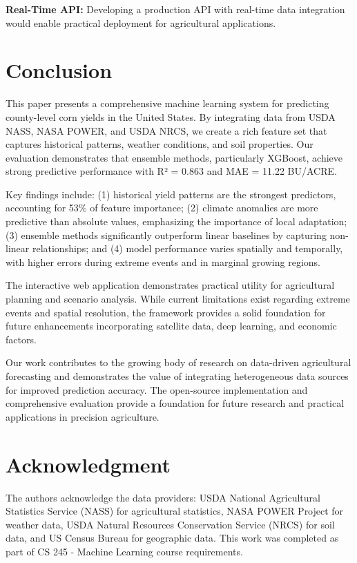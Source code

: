 \documentclass[conference]{IEEEtran}
\begin{document}
\textbf{Real-Time API:} Developing a production API with real-time data integration would enable practical deployment for agricultural applications.

\section{Conclusion}

This paper presents a comprehensive machine learning system for predicting county-level corn yields in the United States. By integrating data from USDA NASS, NASA POWER, and USDA NRCS, we create a rich feature set that captures historical patterns, weather conditions, and soil properties. Our evaluation demonstrates that ensemble methods, particularly XGBoost, achieve strong predictive performance with R² = 0.863 and MAE = 11.22 BU/ACRE.

Key findings include: (1) historical yield patterns are the strongest predictors, accounting for 53\% of feature importance; (2) climate anomalies are more predictive than absolute values, emphasizing the importance of local adaptation; (3) ensemble methods significantly outperform linear baselines by capturing non-linear relationships; and (4) model performance varies spatially and temporally, with higher errors during extreme events and in marginal growing regions.

The interactive web application demonstrates practical utility for agricultural planning and scenario analysis. While current limitations exist regarding extreme events and spatial resolution, the framework provides a solid foundation for future enhancements incorporating satellite data, deep learning, and economic factors.

Our work contributes to the growing body of research on data-driven agricultural forecasting and demonstrates the value of integrating heterogeneous data sources for improved prediction accuracy. The open-source implementation and comprehensive evaluation provide a foundation for future research and practical applications in precision agriculture.

\section*{Acknowledgment}

The authors acknowledge the data providers: USDA National Agricultural Statistics Service (NASS) for agricultural statistics, NASA POWER Project for weather data, USDA Natural Resources Conservation Service (NRCS) for soil data, and US Census Bureau for geographic data. This work was completed as part of CS 245 - Machine Learning course requirements.
\end{document}
